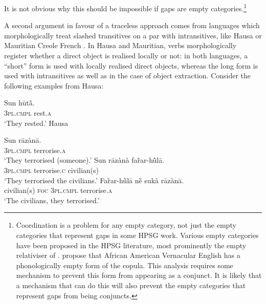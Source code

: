 \documentclass[output=paper
                ,modfonts
                ,nonflat
	        ,collection
	        ,collectionchapter
	        ,collectiontoclongg
 	        ,biblatex
                ,babelshorthands
                ,newtxmath
                ,draftmode
                ,colorlinks, citecolor=brown
]{./langsci/langscibook}
\begin{document}
{\begin{exe} \ex \begin{xlist} \label{ex:UDC:22}

\end{xlist}
\end{exe}

\noindent
It is not obvious why this should be impossible if gaps are empty
categories.\footnote{Coordination is a problem for any empty category,
  not just the empty categories that represent gaps in some HPSG
  work. Various empty categories have been proposed in the HPSG
  literature, most prominently the empty relativiser of
  \citet{Pollard:Sag:94}. \citet[15.3.5]{Sag:Wasow:ea:03}
  propose that African American Vernacular English has a
  phonologically empty form of the copula. This analysis requires some
  mechanism to prevent this form from appearing as a conjunct. It is
  likely that a mechanism that can do this will also prevent the empty
  categories that represent gaps from being conjuncts.
 }

A second argument in favour of a traceless approach comes from
languages which morphologically treat slashed transitives on a par
with intransitives, like Hausa \citep{crysmann_b04yom} or Mauritian
Creole French \citep{Henri10}. In Hausa and Mauritian, verbs
morphologically register whether a direct object is realised locally
or not: in both languages, a ``short'' form is used with locally
realised direct objects, whereas the long form is used with
intransitives as well as in the case of object extraction. Consider
the following examples from Hausa:

\begin{exe}

  \ex \gll Sun hūtā̀.\\
  \textsc{3pl.cmpl} rest.\textsc{a}\\
  \glt `They rested.' \label{ex:UDC:Hau:intr}
  \ex Hausa\label{ex:UDC:Hau:tr}
  \begin{xlist}
    \ex \gll Sun rāzànā.\\
    \textsc{3pl.cmpl} terrorise.\textsc{a}\\
    \glt `They terrorised (someone).' \hfill \citep[632]{newman_p00}
    \ex \gll Sun rāzànà far̃ar-hū̀lā.\\
    \textsc{3pl.cmpl} terrorise.\textsc{c} civilian(s)\\
    \glt `They terrorised the civilians.' \hfill \citep[632]{newman_p00}
    \ex \gll Far̃ar-hū̀lā nḕ sukà rāzànā.\\
    civilian(s) \textsc{foc} \textsc{3pl.cmpl} terrorise.\textsc{a}\\
    \glt `The civilians, they terrorised.' 
  \end{xlist}
  

\end{exe}}
\end{document}
